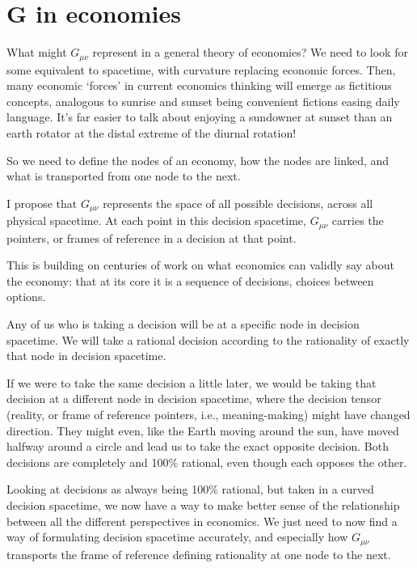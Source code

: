 \section*{G in economies}


What might $G_{\mu\nu}$ represent in a general theory of economies? We need to look for some equivalent to spacetime, with curvature replacing economic forces. Then, many economic ‘forces’ in current economics thinking will emerge as fictitious concepts, analogous to sunrise and sunset being convenient fictions easing daily language. It’s far easier to talk about enjoying a sundowner at sunset than an earth rotator at the distal extreme of the diurnal rotation!


So we need to define the nodes of an economy, how the nodes are linked, and what is transported from one node to the next.


I propose that $G_{\mu\nu}$ represents the space of all possible decisions, across all physical spacetime. At each point in this decision spacetime, $G_{\mu\nu}$ carries the pointers, or frames of reference in a decision at that point.


This is building on centuries of work on what economics can validly say about the economy: that at its core it is a sequence of decisions, choices between options.


Any of us who is taking a decision will be at a specific node in decision spacetime. We will take a rational decision according to the rationality of exactly that node in decision spacetime.


If we were to take the same decision a little later, we would be taking that decision at a different node in decision spacetime, where the decision tensor (reality, or frame of reference pointers, i.e., meaning\hyp{}making) might have changed direction. They might even, like the Earth moving around the sun, have moved halfway around a circle and lead us to take the exact opposite decision. Both decisions are completely and 100\% rational, even though each opposes the other.


Looking at decisions as always being 100\% rational, but taken in a curved decision spacetime, we now have a way to make better sense of the relationship between all the different perspectives in economics. We just need to now find a way of formulating decision spacetime accurately, and especially how $G_{\mu\nu}$ transports the frame of reference defining rationality at one node to the next.


